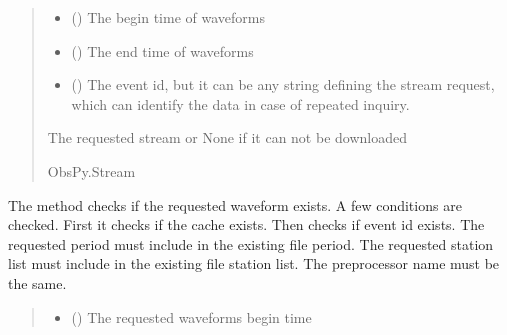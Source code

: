 \documentclass[letterpaper,10pt,english]{sphinxmanual}
\begin{document}
\begin{fulllineitems}
\begin{fulllineitems}
\begin{quote}
\begin{description}
\begin{itemize}
\item {} 
\sphinxAtStartPar
{} () \textendash{} The begin time of waveforms

\item {} 
\sphinxAtStartPar
{} () \textendash{} The end time of waveforms

\item {} 
\sphinxAtStartPar
{} () \textendash{} The event id, but it can be any string defining the stream request,
which can identify the data in case of repeated inquiry.

\end{itemize}

\sphinxAtStartPar
The requested stream or None if it can not be downloaded

\sphinxAtStartPar
ObsPy.Stream

\end{description}\end{quote}

\end{fulllineitems}


\begin{fulllineitems}
\label{\detokenize{api_core:amw.core.signal_utils.StreamLoader.exist_file}}
\pysigstartsignatures
{}
\pysigstopsignatures
\sphinxAtStartPar
The method checks if the requested waveform exists. A few conditions are checked.
First it checks if the cache exists. Then checks if event id exists.
The requested period must include in the existing file period.
The requested station list must include in the existing file station list.
The preprocessor name must be the same.
\begin{quote}\begin{description}
\begin{itemize}
\item {} 
\sphinxAtStartPar
{} () \textendash{} The requested waveforms begin time


\end{itemize}
\end{description}
\end{quote}
\end{fulllineitems}
\end{fulllineitems}
\end{document}
